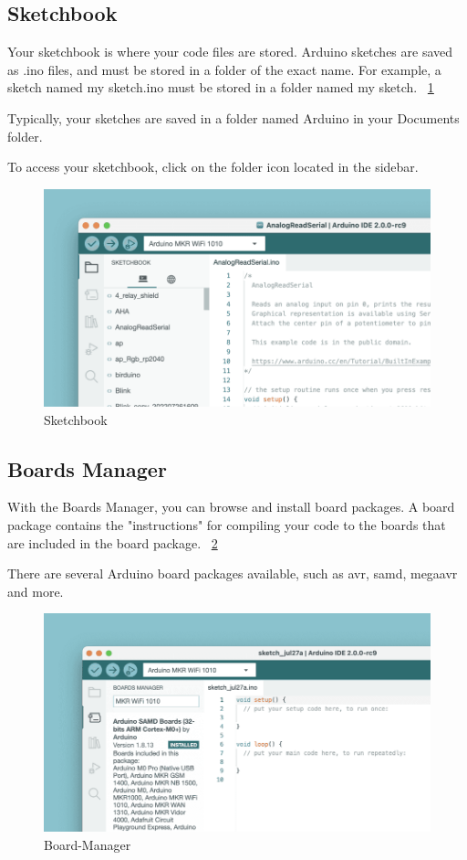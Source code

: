 	\subsection{Sketchbook}
		Your sketchbook is where your code files are stored. Arduino sketches are saved as .ino files, and must be stored in a folder of the exact name. For example, a sketch named my sketch.ino must be stored in a folder named my sketch. ~\ref{local-sketchbook}
		
		Typically, your sketches are saved in a folder named Arduino in your Documents folder.
		
		To access your sketchbook, click on the folder icon located in the sidebar.
		\begin{figure}
			\begin{center}
				\includegraphics[width=0.7\linewidth]{Images/Arduino/local-sketchbook.png}
				\caption{Sketchbook}
				\label{local-sketchbook}
			\end{center}
		\end{figure}
		
	\subsection{Boards Manager}
	With the Boards Manager, you can browse and install board packages. A board package contains the "instructions" for compiling your code to the boards that are included in the board package. ~\ref{board-manager}
	
	There are several Arduino board packages available, such as avr, samd, megaavr and more.
	\begin{figure}
		\begin{center}
			\includegraphics[width=0.7\linewidth]{Images/Arduino/board-manager.png}
			\caption{Board-Manager}
			\label{board-manager}
		\end{center}
	\end{figure}
	

